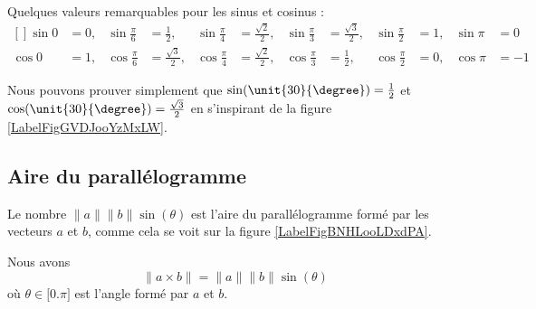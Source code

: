Quelques valeurs remarquables pour les sinus et cosinus :
\begin{equation}
	\begin{aligned}[]
		\sin 0&=0,&\sin\frac{ \pi }{ 6 }&=\frac{ 1 }{2},&\sin\frac{ \pi }{ 4 }&=\frac{ \sqrt{2} }{2},&\sin\frac{ \pi }{ 3 }&=\frac{ \sqrt{3} }{2},&\sin\frac{ \pi }{2}&=1,&\sin\pi&=0\\
		\cos 0&=1,&\cos\frac{ \pi }{ 6 }&=\frac{ \sqrt{3} }{2},&\cos\frac{ \pi }{ 4 }&=\frac{ \sqrt{2} }{2},&\cos\frac{ \pi }{ 3 }&=\frac{ 1 }{2},&\cos\frac{ \pi }{2}&=0,&\cos\pi&=-1
	\end{aligned}
\end{equation}

Nous pouvons prouver simplement que $\sin(\unit{30}{\degree})=\frac{ 1 }{2}$ et $\cos(\unit{30}{\degree})=\frac{ \sqrt{3} }{2}$ en s'inspirant de la figure \ref{LabelFigGVDJooYzMxLW}. %
\newcommand{\CaptionFigGVDJooYzMxLW}{Un triangle équilatéral de côté $1$.}


\subsection{Aire du parallélogramme}

\begin{remark}      \label{RemaAireParalProdVect}
    Le nombre $\| a \|\| b \|\sin(\theta)$ est l'aire du parallélogramme formé par les vecteurs $a$ et $b$, comme cela se voit sur la figure \ref{LabelFigBNHLooLDxdPA}. %
\newcommand{\CaptionFigBNHLooLDxdPA}{Calculer l'aire d'un parallélogramme.}

\end{remark}

\begin{proposition}     \label{PropNormeProdVectoabsint}
    Nous avons
    \begin{equation}
        \| a\times b \|=\| a \|\| b \|\sin(\theta)
    \end{equation}
    où $\theta\in\mathopen[ 0.\pi \mathclose]$ est l'angle formé par $a$ et $b$.
\end{proposition}


